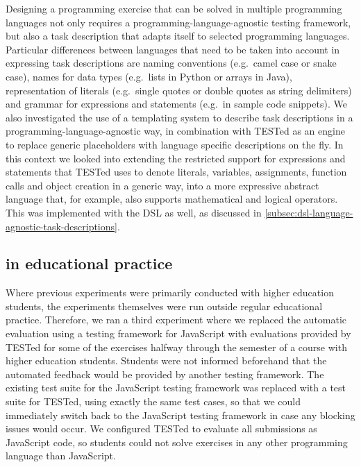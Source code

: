 \documentclass[../main]{subfiles}
\begin{document}
Designing a programming exercise that can be solved in multiple programming languages not only requires a programming-language-agnostic testing framework, but also a task description that adapts itself to selected programming languages.
Particular differences between languages that need to be taken into account in expressing task descriptions are naming conventions (e.g.\ camel case or snake case), names for data types (e.g.\ lists in Python or arrays in Java), representation of literals (e.g.\ single quotes or double quotes as string delimiters) and grammar for expressions and statements (e.g.\ in sample code snippets).
We also investigated the use of a templating system to describe task descriptions in a programming-language-agnostic way, in combination with TESTed as an engine to replace generic placeholders with language specific descriptions on the fly.
In this context we looked into extending the restricted support for expressions and statements that TESTed uses to denote literals, variables, assignments, function calls and object creation in a generic way, into a more expressive abstract language that, for example, also supports mathematical and logical operators.
This was implemented with the DSL as well, as discussed in \cref{subsec:dsl-language-agnostic-task-descriptions}.

\subsection{\tested{} in educational practice}\label{subsec:tested-in-educational-practice}

Where previous experiments were primarily conducted with higher education students, the experiments themselves were run outside regular educational practice.
Therefore, we ran a third experiment where we replaced the automatic evaluation using a testing framework for JavaScript with evaluations provided by TESTed for some of the exercises halfway through the semester of a course with higher education students.
Students were not informed beforehand that the automated feedback would be provided by another testing framework.
The existing test suite for the JavaScript testing framework was replaced with a test suite for TESTed, using exactly the same test cases, so that we could immediately switch back to the JavaScript testing framework in case any blocking issues would occur.
We configured TESTed to evaluate all submissions as JavaScript code, so students could not solve exercises in any other programming language than JavaScript.
\end{document}

